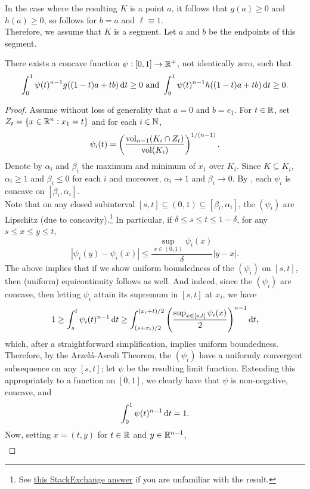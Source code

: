 In the case where the resulting $K$ is a point $a$, it follows that $g(a)\geq 0$ and $h(a)\geq 0$, so  follows for $b=a$ and $\ell\equiv 1$.\\
Therefore, we assume that $K$ is a segment. Let $a$ and $b$ be the endpoints of this segment.

\begin{lemma}
\label{localization lemma lemma 2}
	There exists a concave function $\psi:[0,1]\to\mathbb{R}^+$, not identically zero, such that
	\[ \int_0^1 \psi(t)^{n-1}g((1-t)a+tb)\operatorname{d}\!{t} \geq 0 \text{ and } \int_0^1 \psi(t)^{n-1}h((1-t)a+tb)\operatorname{d}\!{t} \geq 0. \]
\end{lemma}
\begin{proof}
	Assume without loss of generality that $a=0$ and $b=e_1$. For $t\in\mathbb{R}$, set $Z_t = \{x\in\mathbb{R}^n : x_1=t\}$ and for each $i\in\mathbb{N}$,
	\[ \psi_i(t) = \left(\frac{\operatorname{vol}_{n-1}(K_i\cap Z_t)}{\operatorname{vol}(K_i)}\right)^{1/(n-1)}. \]
	Denote by $\alpha_i$ and $\beta_i$ the maximum and minimum of $x_1$ over $K_i$. Since $K\subseteq K_i$, $\alpha_i\geq 1$ and $\beta_i\leq 0$ for each $i$ and moreover, $\alpha_i\to 1$ and $\beta_i\to 0$. By , each $\psi_i$ is concave on $[\beta_i,\alpha_i]$.\\
	Note that on any closed subinterval $[s,t]\subseteq(0,1)\subseteq[\beta_i,\alpha_i]$, the $(\psi_i)$ are Lipschitz (due to concavity).\footnote{See \href{https://math.stackexchange.com/a/2662341/447210}{this StackExchange answer} if you are unfamiliar with the result.} In particular, if $\delta\leq s\leq t\leq 1-\delta$, for any $s\leq x\leq y\leq t$,
	\[ |\psi_i(y)-\psi_i(x)| \leq \frac{\sup_{x\in (0,1)} \psi_i(x)}{\delta} |y-x|. \]
	The above implies that if we show uniform boundedness of the $(\psi_i)$ on $[s,t]$, then (uniform) equicontinuity follows as well. And indeed, since the $(\psi_i)$ are concave, then letting $\psi_i$ attain its supremum in $[s,t]$ at $x_i$, we have 
	\[ 1 \geq \int_s^t \psi_i(t)^{n-1}\operatorname{d}\!{t} \geq \int_{(s+x_i)/2}^{(x_i+t)/2} \left(\frac{\sup_{x\in[s,t]} \psi_i(x)}{2}\right)^{n-1}\operatorname{d}\!{t}, \]
	which, after a straightforward simplification, implies uniform boundedness.\\
	Therefore, by the Arzel\'a-Ascoli Theorem, the $(\psi_i)$ have a uniformly convergent subsequence on any $[s,t]$; let $\psi$ be the resulting limit function. Extending this appropriately to a function on $[0,1]$, we clearly have that $\psi$ is non-negative, concave, and
	\[ \int_0^1 \psi(t)^{n-1}\operatorname{d}\!{t} = 1. \]
	Now, setting $x=(t,y)$ for $t\in\mathbb{R}$ and $y\in\mathbb{R}^{n-1}$,
	\begin{align*}

\end{align*}
\end{proof}
